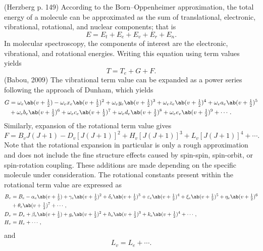 \documentclass[11pt, twoside, fleqn]{report}
\begin{document}
(Herzberg p. 149)
According to the Born--Oppenheimer approximation, the total energy of a molecule can be approximated as the sum of translational, electronic, vibrational, rotational, and nuclear components; that is
\begin{equation*}
    E = E_{t} + E_{e} + E_{v} + E_{r} + E_{n}.
\end{equation*}
In molecular spectroscopy, the components of interest are the electronic, vibrational, and rotational energies. Writing this equation using term values yields
\begin{equation*}
    T = T_{e} + G + F.
\end{equation*}
(Babou, 2009)
The vibrational term value can be expanded as a power series following the approach of Dunham, which yields
\begin{align*}
    G & = \omega_{e}\ab(v + \tfrac{1}{2}) - \omega_{e}x_{e}\ab(v + \tfrac{1}{2})^{2} + \omega_{e}y_{e}\ab(v + \tfrac{1}{2})^{3} + \omega_{e}z_{e}\ab(v + \tfrac{1}{2})^{4} + \omega_{e}a_{e}\ab(v + \tfrac{1}{2})^{5} \\
      & + \omega_{e}b_{e}\ab(v + \tfrac{1}{2})^{6} + \omega_{e}c_{e}\ab(v + \tfrac{1}{2})^{7} + \omega_{e}d_{e}\ab(v + \tfrac{1}{2})^{8} + \omega_{e}e_{e}\ab(v + \tfrac{1}{2})^{9} + \dotsb.
\end{align*}
Similarly, expansion of the rotational term value gives
\begin{equation*}
    F = B_{v}J(J + 1) - D_{v}[J(J + 1)]^{2} + H_{v}[J(J + 1)]^{3} + L_{v}[J(J + 1)]^{4} + \dotsb.
\end{equation*}
Note that the rotational expansion in particular is only a rough approximation and does not include the fine structure effects caused by spin-spin, spin-orbit, or spin-rotation coupling. These additions are made depending on the specific molecule under consideration. The rotational constants present within the rotational term value are expressed as
\begin{align*}
    B_{v} & = B_{e} - \alpha_{e}\ab(v + \tfrac{1}{2}) + \gamma_{e}\ab(v + \tfrac{1}{2})^{2} + \delta_{e}\ab(v + \tfrac{1}{2})^{3} + \varepsilon_{e}\ab(v + \tfrac{1}{2})^{4} + \xi_{e}\ab(v + \tfrac{1}{2})^{5} + \eta_{e}\ab(v + \tfrac{1}{2})^{6} \\
          & + \theta_{e}\ab(v + \tfrac{1}{2})^{7} + \dotsb,                                                                                                                                                                                         \\
    D_{v} & = D_{e} + \beta_{e}\ab(v + \tfrac{1}{2}) + g_{e}\ab(v + \tfrac{1}{2})^{2} + h_{e}\ab(v + \tfrac{1}{2})^{3} + k_{e}\ab(v + \tfrac{1}{2})^{4} + \dotsb,                                                                                   \\
    H_{v} & = H_{e} + \dotsb,
\end{align*}
and
\begin{equation*}
    L_{v} = L_{e} + \dotsb.
\end{equation*}
\end{document}
